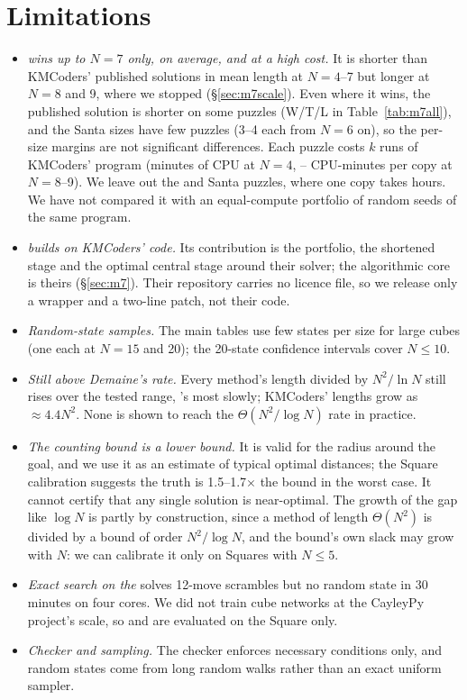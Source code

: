 \section{Limitations}
\label{sec:limitations}

\begin{itemize}
\item \emph{\Mseven wins up to $N=7$ only, on average, and at a high cost.} It is shorter than KMCoders' published solutions in
  mean length at $N=4$--7 but longer at $N=8$ and 9, where we stopped (\S\ref{sec:m7scale}). Even where it wins, the
  published solution is shorter on some puzzles (W/T/L in Table~\ref{tab:m7all}), and the Santa sizes have few puzzles (3--4 each
  from $N=6$ on), so the per-size margins are not significant differences. Each puzzle costs $k$ runs of KMCoders' program (minutes
  of CPU at $N=4$, \ScaleCpuEight--\ScaleCpuNine{} CPU-minutes per copy at $N=8$--9). We leave out the  and  Santa
  puzzles, where one copy takes hours. We have not compared it with an equal-compute portfolio of random seeds of the same program.
\item \emph{\Mseven builds on KMCoders' code.} Its contribution is the portfolio, the shortened stage and the optimal central
  stage around their solver; the algorithmic core is theirs (\S\ref{sec:m7}). Their repository carries no licence file, so we
  release only a wrapper and a two-line patch, not their code.
\item \emph{Random-state samples.} The main tables use few states per size for large cubes (one each at $N=15$ and 20); the 20-state
  confidence intervals cover $N\le10$.
\item \emph{Still above Demaine's rate.} Every method's length divided by $N^2/\ln N$ still rises over the tested range, \FiveC's
  most slowly; KMCoders' lengths grow as $\approx4.4N^2$. None is shown to reach the $\Theta(N^2/\log N)$ rate in practice.
\item \emph{The counting bound is a lower bound.} It is valid for the radius around the goal, and we use it as an estimate of
  typical optimal distances; the Square calibration suggests the truth is 1.5--1.7$\times$ the bound in the worst case. It cannot
  certify that any single solution is near-optimal. The growth of the gap like $\log N$ is partly by construction, since a method of
  length $\Theta(N^2)$ is divided by a bound of order $N^2/\log N$, and the bound's own slack may grow with $N$: we can calibrate it
  only on Squares with $N\le5$.
\item \emph{Exact search on the } solves 12-move scrambles but no random state in 30 minutes on four cores. We did not
  train cube networks at the CayleyPy project's scale, so \Mfour and \FiveA are evaluated on the Square only.
\item \emph{Checker and sampling.} The checker enforces necessary conditions only, and random states come from long random walks
  rather than an exact uniform sampler.
\end{itemize}

